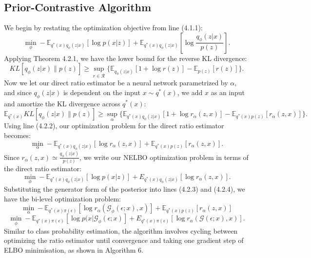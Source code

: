 \documentclass[honours,12pt]{unswthesis}
\newcommand{\E}{\mathbb{E}}
\numberwithin{equation}{section}
\theoremstyle{definition}
\begin{document}
\subsection{Prior-Contrastive Algorithm}
We begin by restating the optimization objective from line (4.1.1):
\[\min_\phi -\mathbb{E}_{q^*(x)q_\phi(z|x)}[\log p(x|z)]+\mathbb{E}_{q^*(x)q_\phi(z|x)}\left[\log \frac{q_\phi(z|x)}{p(z)}\right].\]
Applying Theorem 4.2.1, we have the lower bound for the reverse KL divergence:
\[KL[q_\phi(z|x)\|p(z)]\geq \sup_{\hat{r}\in \mathcal{R}}\{\mathbb{E}_{q_\phi(z|x)}[1+\log r(z)]-\mathbb{E}_{p(z)}[r(z)]\}.\]
Now we let our direct ratio estimator be a neural network parametrized by $\alpha$, and since $q_\phi(z|x)$ is dependent on the input $x\sim q^*(x)$, we add $x$ as an input and amortize the KL divergence across $q^*(x)$:
\[\mathbb{E}_{q^*(x)}KL[q_\phi(z|x)\|p(z)]\geq \sup_\alpha \{\mathbb{E}_{q^*(x)q_\phi(z|x)}[1+\log r_\alpha(z,x)]-\mathbb{E}_{q^*(x)p(z)}[r_\alpha (z,x)]\}.\]
Using line (4.2.2), our optimization problem for the direct ratio estimator becomes:
\begin{equation}
\min_\alpha -\E_{q^*(x)q_\phi(z|x)}[\log r_\alpha(z,x)]+\E_{q^*(x)p(z)}[r_\alpha (z,x)].
\end{equation}
Since $r_\alpha(z,x)\simeq \frac{q_\phi(z|x)}{p(z)}$, we write our NELBO optimization problem in terms of the direct ratio estimator:
\begin{equation}
\min_\phi -\mathbb{E}_{q^*(x)q_\phi(z|x)}\left[\log p(x|z)\right]+E_{q^*(x)q_\phi (z|x)}[\log r_\alpha(z,x)].
\end{equation}
Substituting the generator form of the posterior into lines (4.2.3) and (4.2.4), we have the bi-level optimization problem:
\[\min_\alpha -\mathbb{E}_{q^*(x)\pi(\epsilon)}[\log r_\alpha(\mathcal{G}_\phi(\epsilon;x),x)]+\mathbb{E}_{q^*(x)p(z)}[r_\alpha(z,x)]\]
\[\min_\phi -\mathbb{E}_{q^*(x)\pi(\epsilon)}\left[\log p(x|\mathcal{G}_\phi(\epsilon;x)\right]+E_{q^*(x)\pi(\epsilon)}[\log r_\alpha(\mathcal{G}(\epsilon;x),x)].\]
Similar to class probability estimation, the algorithm involves cycling between optimizing the ratio estimator until convergence and taking one gradient step of ELBO minimisation, as shown in Algorithm 6.
\newpage
\end{document}
